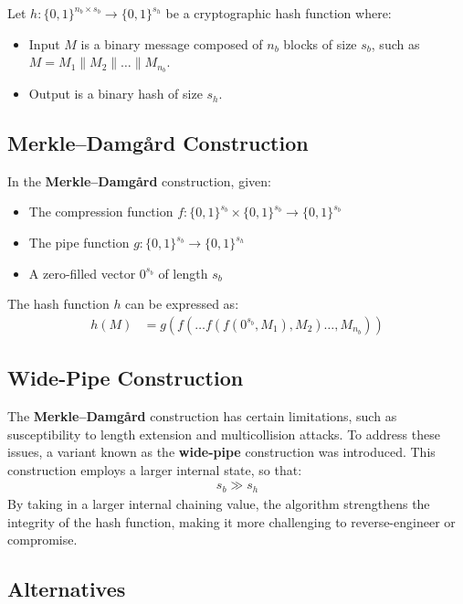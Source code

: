 \documentclass[11pt]{article}
\begin{document}
Let \( h: \{0,1\}^{n_b \times s_b} \to \{0,1\}^{s_h} \) be a cryptographic hash function where: 

\begin{itemize}
    \item Input \( M \) is a binary message composed of \( n_b \) blocks of size \( s_b \), such as \( M = M_1 \parallel M_2 \parallel \ldots \parallel M_{n_b} \).
    \item Output is a binary hash of size \( s_h \).
\end{itemize}

\subsection{Merkle–Damgård Construction}

In the \textbf{Merkle–Damgård} construction, given:
\begin{itemize}
    \item The compression function \( f: \{0,1\}^{s_b} \times \{0,1\}^{s_b} \to \{0,1\}^{s_b} \)
    \item The pipe function \( g: \{0,1\}^{s_b} \to \{0,1\}^{s_h} \)
    \item A zero-filled vector \( 0^{s_b} \) of length \( s_b \)
\end{itemize}
The hash function \( h \) can be expressed as:
\begin{align*}
    h(M) &= g\left( f(\ldots f(f(0^{s_b}, M_1), M_2) \ldots, M_{n_b}) \right)
\end{align*}

\subsection{Wide-Pipe Construction} \label{widepipe}

The \textbf{Merkle–Damgård} construction has certain limitations, such as susceptibility to length extension and multicollision attacks. To address these issues, a variant known as the \textbf{wide-pipe} construction was introduced. This construction employs a larger internal state, so that:
\begin{align*}
    s_b \gg s_h
\end{align*}
By taking in a larger internal chaining value, the algorithm strengthens the integrity of the hash function, making it more challenging to reverse-engineer or compromise.

\subsection{Alternatives}
\end{document}
